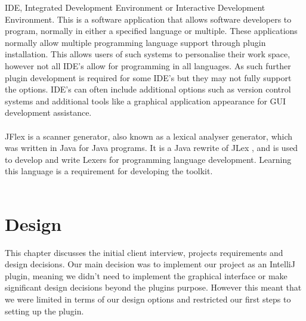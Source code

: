 \documentclass{l3proj}
\begin{document}
IDE, Integrated Development Environment or Interactive Development Environment. This is a software application that allows software developers to program, normally in either a specified language or multiple. These applications normally allow multiple programming language support through plugin installation. This allows users of such systems to personalise their work space, however not all IDE's allow for programming in all languages. As such further plugin development is required for some IDE's but they may not fully support the options. IDE's can often include additional options such as version control systems and additional tools like a graphical application appearance for GUI development assistance.\\
\\
JFlex is a scanner generator, also known as a lexical analyser generator, which was written in Java for Java programs. It is a Java rewrite of JLex , and is used to develop and write Lexers for programming language development. Learning this language is a requirement for developing the toolkit. \\
\\

%


\chapter{Design}
\label{design}
This chapter discusses the initial client interview, projects requirements and design decisions. Our main decision was to implement our project as an IntelliJ plugin, meaning we didn't need to implement the graphical interface or make significant design decisions beyond the plugins purpose.  However this meant that we were limited in terms of our design options and restricted our first steps to setting up the plugin.\\
\\
\end{document}
